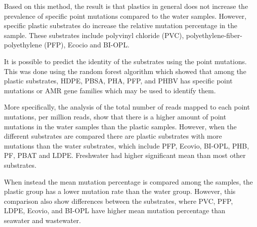 Based on this method, the result is that plastics in general does not increase the prevalence of specific point mutations compared to the water samples. 
However, specific plastic substrates do increase the relative mutation percentage in the sample. 
These substrates include polyvinyl chloride (PVC), polyethylene-fiber-polyethylene (PFP), Ecocio and BI-OPL.

It is possible to predict the identity of the substrates using the point mutations. This was done using the random forest algorithm which showed that among the plastic substrates, HDPE, PBSA, PHA, PFP, and PHBV has specific point mutations or AMR gene families which may be used to identify them.


More specifically, the analysis of the total number of reads mapped to each point mutations, per million reads, show that there is a higher amount of point mutations in the water samples than the plastic samples. 
However, when the different substrates are compared there are plastic substrates with more mutations than the water substrates, which include PFP, Ecovio, BI-OPL, PHB, PF, PBAT and LDPE. Freshwater had higher significant mean than most other substrates.

When instead the mean mutation percentage is compared among the samples, the plastic group has a lower mutation rate than the water group. However, this comparison also show differences between the substrates, where PVC, PFP, LDPE, Ecovio, and BI-OPL have higher mean mutation percentage than seawater and wastewater. 

